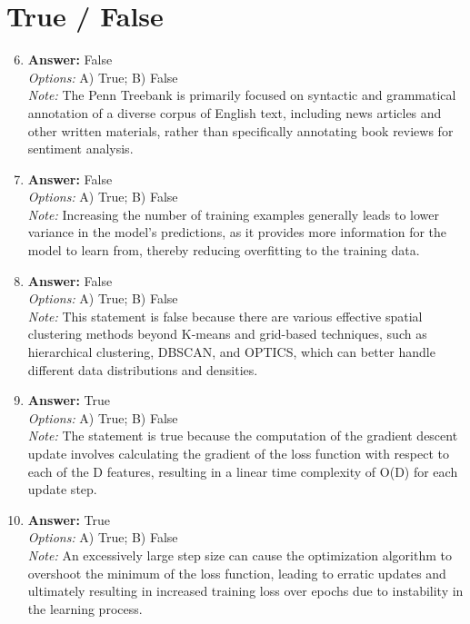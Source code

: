 \documentclass[12pt]{article}
\begin{document}
\section*{True / False}
\begin{enumerate}[label=\arabic*.]
\setcounter{enumi}{5}
\item \textbf{Answer:} False
\\ \textit{Options:} A) True; B) False
\\ \textit{Note:} The Penn Treebank is primarily focused on syntactic and grammatical annotation of a diverse corpus of English text, including news articles and other written materials, rather than specifically annotating book reviews for sentiment analysis.
\item \textbf{Answer:} False
\\ \textit{Options:} A) True; B) False
\\ \textit{Note:} Increasing the number of training examples generally leads to lower variance in the model's predictions, as it provides more information for the model to learn from, thereby reducing overfitting to the training data.
\item \textbf{Answer:} False
\\ \textit{Options:} A) True; B) False
\\ \textit{Note:} This statement is false because there are various effective spatial clustering methods beyond K-means and grid-based techniques, such as hierarchical clustering, DBSCAN, and OPTICS, which can better handle different data distributions and densities.
\item \textbf{Answer:} True
\\ \textit{Options:} A) True; B) False
\\ \textit{Note:} The statement is true because the computation of the gradient descent update involves calculating the gradient of the loss function with respect to each of the D features, resulting in a linear time complexity of O(D) for each update step.
\item \textbf{Answer:} True
\\ \textit{Options:} A) True; B) False
\\ \textit{Note:} An excessively large step size can cause the optimization algorithm to overshoot the minimum of the loss function, leading to erratic updates and ultimately resulting in increased training loss over epochs due to instability in the learning process.
\end{enumerate}
\end{document}
